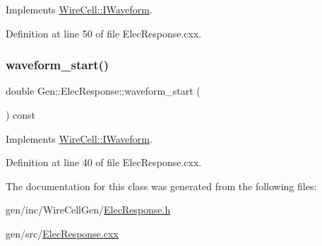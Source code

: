Implements \hyperlink{class_wire_cell_1_1_i_waveform_a4901f7f36170f22c3e89ebd7939be4d0}{Wire\+Cell\+::\+I\+Waveform}.



Definition at line 50 of file Elec\+Response.\+cxx.

\mbox{\label{class_wire_cell_1_1_gen_1_1_elec_response_a098956b30d90fb379d538052204011f5}} 
\subsubsection{\texorpdfstring{waveform\+\_\+start()}{waveform\_start()}}
{\footnotesize\ttfamily double Gen\+::\+Elec\+Response\+::waveform\+\_\+start (\begin{DoxyParamCaption}{ }\end{DoxyParamCaption}) const\hspace{0.3cm}{\ttfamily [virtual]}}



Implements \hyperlink{class_wire_cell_1_1_i_waveform_ac7dfdf92e835bf708838bcdc1ba91ba2}{Wire\+Cell\+::\+I\+Waveform}.



Definition at line 40 of file Elec\+Response.\+cxx.



The documentation for this class was generated from the following files\+:\begin{DoxyCompactItemize}
\item 
gen/inc/\+Wire\+Cell\+Gen/\hyperlink{_elec_response_8h}{Elec\+Response.\+h}\item 
gen/src/\hyperlink{_elec_response_8cxx}{Elec\+Response.\+cxx}\end{DoxyCompactItemize}
